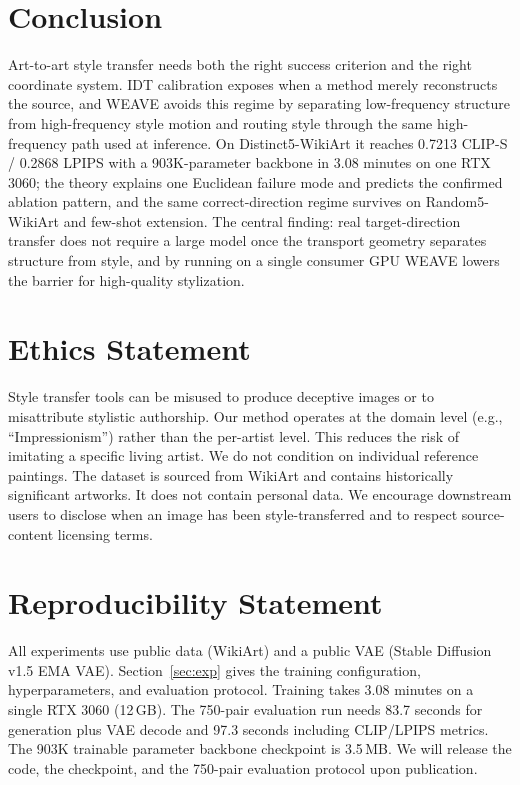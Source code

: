 \documentclass[letterpaper]{article}
\begin{document}
\section{Conclusion}

Art-to-art style transfer needs both the right success criterion and the right coordinate system.
IDT calibration exposes when a method merely reconstructs the source, and WEAVE avoids this regime by separating low-frequency structure from high-frequency style motion and routing style through the same high-frequency path used at inference.
On Distinct5-WikiArt it reaches 0.7213 CLIP-S / 0.2868 LPIPS with a 903K-parameter backbone in 3.08 minutes on one RTX 3060; the theory explains one Euclidean failure mode and predicts the confirmed ablation pattern, and the same correct-direction regime survives on Random5-WikiArt and few-shot extension.
The central finding: real target-direction transfer does not require a large model once the transport geometry separates structure from style, and by running on a single consumer GPU WEAVE lowers the barrier for high-quality stylization.

\section*{Ethics Statement}
Style transfer tools can be misused to produce deceptive images or to misattribute stylistic authorship.
Our method operates at the domain level (e.g., ``Impressionism'') rather than the per-artist level.
This reduces the risk of imitating a specific living artist.
We do not condition on individual reference paintings.
The dataset is sourced from WikiArt and contains historically significant artworks.
It does not contain personal data.
We encourage downstream users to disclose when an image has been style-transferred and to respect source-content licensing terms.

\section*{Reproducibility Statement}
All experiments use public data (WikiArt) and a public VAE (Stable Diffusion v1.5 EMA VAE).
Section~\ref{sec:exp} gives the training configuration, hyperparameters, and evaluation protocol.
Training takes 3.08 minutes on a single RTX 3060 (12\,GB).
The 750-pair evaluation run needs 83.7 seconds for generation plus VAE decode and 97.3 seconds including CLIP/LPIPS metrics.
The 903K trainable parameter backbone checkpoint is 3.5\,MB.
We will release the code, the checkpoint, and the 750-pair evaluation protocol upon publication.


\end{document}
